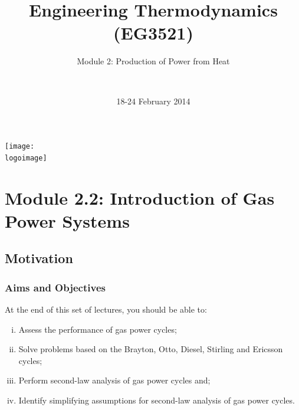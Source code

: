 \documentclass[10pt,compress]{beamer}
\institute{School of Engineering}
\title{Engineering Thermodynamics (EG3521)}
\subtitle{Module 2: Production of Power from Heat}
\date[18-24/02/2014]{18-24 February 2014}
\author[\shortname]{%
  \fullname\\\ttfamily{\emailaddress}
}
\newcommand{\logoimage}{../FigBanner/UoAHorizBanner}
\begin{document}
\begin{frame}
  \titlepage
  \vfill%
  \begin{center}
    \texttt{[image: \\logoimage]}
  \end{center}
\end{frame}




\section{Module 2.2: Introduction of Gas Power Systems}

\subsection{Motivation}
\begin{frame}
 \frametitle{Aims and Objectives}
 At the end of this set of lectures, you should be able to:
 \begin{enumerate}[(i)]
  \item <1-> Assess the performance of gas power cycles;
  \item <2-> Solve problems based on the Brayton, Otto, Diesel, Stirling and Ericsson cycles;
  \item <3-> Perform second-law analysis of gas power cycles and;
  \item <4-> Identify simplifying assumptions for second-law analysis of gas power cycles.
 \end{enumerate}
\end{frame}
\end{document}
